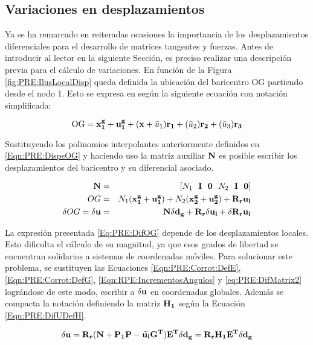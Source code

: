 \subsection{Variaciones en desplazamientos} \label{Sec:PRE:VariacionesDesplazamientos}
Ya se ha remarcado en reiteradas ocasiones la importancia de los desplazamientos diferenciales para el desarrollo de matrices tangentes y fuerzas. Antes de introducir al lector en la siguiente Sección, es preciso realizar una descripción previa para el cálculo de variaciones. En función de la Figura \ref{fig:PRE:IlusLocalDisp} queda definida la ubicación del baricentro OG partiendo desde el nodo 1. Esto se expresa en según la siguiente ecuación con notación simplificada:
 
\begin{equation}\label{Eqn:PRE:DispsOG}
 	\text{OG} = \bf{x}_1^g+\bf{u}_1^g + (x+\text{$\bar{u}_1$}) \bf{r_1} + (\text{$\bar{u}_2$})\bf{r_2}+ (\text{$\bar{u}_3$})\bf{r_3}	
\end{equation}

Sustituyendo los polinomios interpolantes anteriormente definidos en \eqref{Eqn:PRE:DispsOG} y haciendo uso la matriz auxiliar $\bf{N}$ es posible escribir los desplazamientos del baricentro y su diferencial asociado. 

\begin{eqnarray}
	\bf{N}&=&[\text{$N_1$}~~ \bf{I}~~ \bf{0}~~ \text{$N_2$}~~ \bf{I}~~ \bf{0}]\\
	OG    &=& \text{$N_1$}(\bf{x}_1^g+\bf{u}_1^g)+\text{$N_2$}(\bf{x}_2^g+\bf{u}_2^g)+ \bf{R}_r \bf{u}_l \\ \label{Eq:PRE:DifOG}
	\delta OG = \delta \bf{u} &= &\bf{N}\delta\bf{d}_g+\bf{R}_r \delta\bf{u}_l + \delta \bf{R}_r \bf{u}_l	
\end{eqnarray}

 La expresión presentada \eqref{Eq:PRE:DifOG} depende de los desplazamientos locales. Esto dificulta el cálculo de su magnitud, ya que esos grados de libertad se encuentran solidarios a sistemas de coordenadas móviles. Para solucionar este problema, se sustituyen las Ecuaciones \eqref{Eqn:PRE:Corrot:DefE}, \eqref{Eqn:PRE:Corrot:DefG}, \eqref{Eqn:RPE:IncrementosAngulos} y \eqref{eq:PRE:DifMatrix2} lográndose de este modo, escribir a $ \delta \bf{u}$ en coordenadas globales. Además se compacta la notación definiendo la matriz $\bf{H}_1$ según la Ecuación \eqref{Eqn:PRE:DifUDefH}.
 
 \begin{equation}\label{Eqn:PRE:DifUDefH}
	\delta \bf{u} = \bf{R}_r(\bf{N}+\bf{P}_1\bf{P}-\widetilde{\bf{u}_l}\bf{G}^T)\bf{E}^T \delta \bf{d}_g = \bf{R}_r \bf{H}_1 \bf{E}^T \delta \bf{d}_g 
 \end{equation}
 
